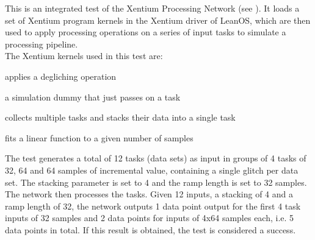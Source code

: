 This is an integrated test of the \gls{Xentium} Processing Network
(see ). It loads a set of \gls{Xentium} program kernels in the
Xentium driver of LeanOS, which are then used to apply processing operations on
a series of input tasks to simulate a processing pipeline.\\

\noindent
The Xentium kernels used in this test are:

\begin{description}[labelwidth=4em,leftmargin=\parindent,labelindent=\parindent]
	\item[\textbf{deglitch}] applies a degliching operation
	\item[\textbf{dummy}]	 a simulation dummy that just passes on a task
	\item[\textbf{stack}]	 collects multiple tasks and stacks their data into a single task
	\item[\textbf{rampfit}]	 fits a linear function to a given number of samples
\end{description}

\noindent
The test generates a total of 12 tasks (data sets) as input in groups of 4 tasks
of 32, 64 and 64 samples of incremental value, containing a single glitch per
data set. The stacking parameter is set to 4 and the ramp length is set to 32
samples.\\

\noindent
The network then processes the tasks. Given 12 inputs, a stacking of 4 and a
ramp length of 32, the network outputs 1 data point output for the first 4 task
inputs of 32 samples and 2 data points for inputs of 4x64 samples each,
i.e. 5 data points in total. If this result is obtained, the test is considered
a success.\\








